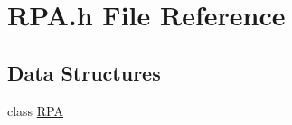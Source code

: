 \hypertarget{a00037}{\section{R\-P\-A.\-h File Reference}
\label{a00037}
}
\subsection*{Data Structures}
\begin{DoxyCompactItemize}
\item 
class \hyperlink{a00012}{R\-P\-A}
\end{DoxyCompactItemize}
